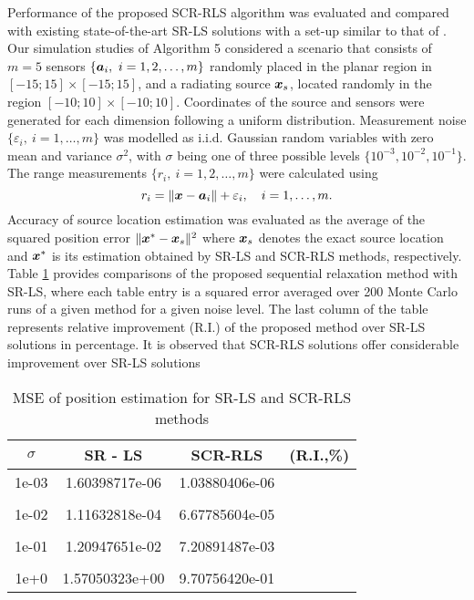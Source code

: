 Performance of the proposed SCR-RLS algorithm was evaluated and compared with existing state-of-the-art SR-LS solutions \cite{BeckStLi} with a set-up similar to that of \cite{BeckStLi}.   Our simulation studies of Algorithm 5 considered a scenario that consists of  $m = 5$ sensors $\{\mbox{\boldmath$a$}_i, \ i=1, 2,\ldots,m\}$ randomly placed in the planar region in $[-15;15]\times[-15;15]$, and a radiating source $\mbox{\boldmath$x$}_s$, located randomly in the region $[-10;10]\times[-10;10]$. Coordinates of the source and sensors were generated for each dimension following a uniform distribution. 
Measurement noise $\{\varepsilon_i, \ i=1,\ldots, m\}$ was modelled as i.i.d. Gaussian random variables with zero mean and variance $\sigma^2$, with $\sigma$ being one of three possible levels $\{10^{-3}, 10^{-2}, 10^{-1}\}$. The range measurements $\{r_i, \ i=1, 2,\ldots, m\}$ were calculated using 
\setcounter{abc}{0}
\begin{equation} \label{eq:5.0}
\nonumber
r_i = \|{\mbox{\boldmath$x$}} - {\mbox{\boldmath$a$}}_i\| + \varepsilon_i, \quad i = 1, \ldots , m.
\end{equation}
Accuracy of source location estimation was evaluated as the average of the squared position error $\|\mbox{\boldmath$x$}^* - \mbox{\boldmath$x$}_s\|^2$ where $\mbox{\boldmath$x$}_s$ denotes the exact source location and $\mbox{\boldmath$x$}^*$ is its estimation obtained by SR-LS and SCR-RLS methods, respectively. Table \ref{tab:scr_rls} provides comparisons of the proposed sequential relaxation method with SR-LS, where each table entry is a squared error averaged over 200 Monte Carlo runs of a given method for a given noise level. The last column of the table  represents relative improvement (R.I.) of the proposed method over SR-LS solutions in percentage. It is observed that SCR-RLS solutions offer considerable improvement over SR-LS solutions


\begin{table}[h]
\centering
\caption{MSE of position estimation for SR-LS and SCR-RLS methods}
\phantom{m}
\begin{tabular}{|c|c|c|c|} \hline
\centering
$\sigma$ & SR - LS & SCR-RLS & (R.I.,\%)  \\ \hline
1e-03&	1.60398717e-06 & 1.03880406e-06 &   \\ &&&\\
1e-02&	1.11632818e-04 & 6.67785604e-05 &   \\ &&&\\
1e-01&	1.20947651e-02 & 7.20891487e-03 &    \\ &&&\\
1e+0&	1.57050323e+00 & 9.70756420e-01 &     \\ %
\hline
\end{tabular}
\label{tab:scr_rls}
\end{table}

